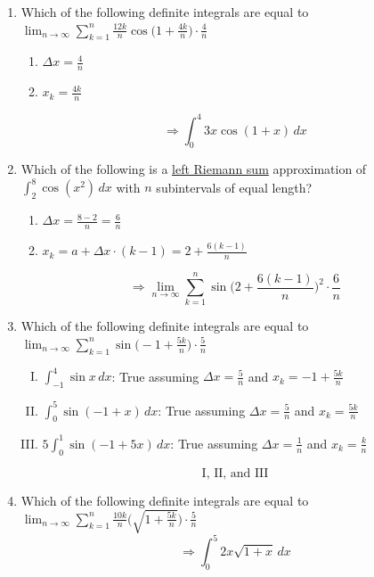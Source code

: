 \documentclass[12pt]{article}
\begin{document}
\begin{enumerate}
    \item Which of the following definite integrals are equal to $\lim_{n\to\infty} \sum_{k=1}^{n} \frac{12k}{n}\cos\biggr(1+\frac{4k}{n} \biggr) \cdot \frac{4}{n}$
    \begin{enumerate}
        \item $\Delta x = \frac{4}{n}$
        \item $x_k=\frac{4k}{n}$
    \end{enumerate}
    $$\Longrightarrow \boxed{\int_{0}^{4} 3x \cos(1+x) \, dx}$$
    \item  Which of the following is a \underline{left Riemann sum} approximation of $\int_{2}^{8} \cos(x^2) \, dx$ with $n$ subintervals of equal length?
\begin{enumerate}
        \item $\Delta x = \frac{8-2}{n} = \frac{6}{n}$
        \item $x_k = a + \Delta x \cdot (k-1)  =  2 + \frac{6(k-1)}{n}$
    \end{enumerate}
    $$\Longrightarrow \boxed{\lim_{n\to\infty} \sum_{k=1}^{n} \sin\biggr(2+\frac{6(k-1)}{n} \biggr)^2 \cdot \frac{6}{n}}$$
    \item Which of the following definite integrals are equal to $\lim_{n\to\infty} \sum_{k=1}^{n} \sin\biggr(-1+\frac{5k}{n} \biggr) \cdot \frac{5}{n}$
\begin{enumerate}[I.]
        \item $\int_{-1}^{4} \sin x \, dx$: True assuming $\Delta x = \frac{5}{n}$ and $x_k = -1 + \frac{5k}{n}$
        \item $\int_{0}^{5} \sin(-1+x) \, dx$: True assuming $\Delta x = \frac{5}{n}$ and $x_k = \frac{5k}{n}$
        \item $5 \int_{0}^{1} \sin(-1 +5x) \, dx$: True assuming $\Delta x = \frac{1}{n}$ and $x_k = \frac{k}{n}$
    \end{enumerate}
    $$\boxed{\text{I, II, and III}}$$
    
   \item Which of the following definite integrals are equal to $\lim_{n\to\infty} \sum_{k=1}^{n} \frac{10k}{n}\biggr(\sqrt{1+\frac{5k}{n}} \biggr) \cdot \frac{5}{n}$
$$\Longrightarrow \boxed{\int_{0}^{5} 2x\sqrt{1+x} \, dx}$$
   

\end{enumerate}
\end{document}
